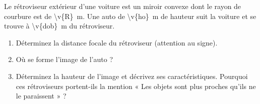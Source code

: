 Le rétroviseur extérieur d'une voiture est un miroir convexe dont le rayon de courbure est de \qty{\v{R}}{m}. Une auto de \qty{\v{ho}}{m} de hauteur suit la voiture et se trouve à \qty{\v{dob}}{m} du rétroviseur.

\begin{enumerate}[label=\alph*)]
    \item Déterminez la distance focale du rétroviseur (attention au signe).
    \item Où se forme l'image de l'auto ?
    \item Déterminez la hauteur de l'image et décrivez ses caractéristiques. Pourquoi ces rétroviseurs portent-ils la mention « Les objets sont plus proches qu'ils ne le paraissent » ?
\end{enumerate}
